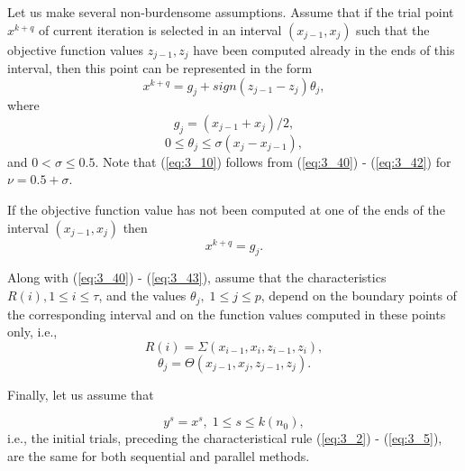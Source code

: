 	Let us make several non-burdensome assumptions. Assume that if the trial point $x^{k+q} $ of current iteration is selected in an interval $(x_{j-1} ,x_{j} )$ such that the objective function values $z_{j-1} ,z_j $ have been computed already in the ends of this interval, then this point can be represented in the form
	\begin{equation}
	\label{eq:3_40}
	x^{k+q} =g_{j} +sign(z_{j-1} -z_{j} )\theta _{j} ,
	\end{equation}
	where
	\begin{equation}
	\label{eq:3_41}
	g_{j} =(x_{j-1} +x_{j} )/2, 
	\end{equation}
	\begin{equation}
	\label{eq:3_42}
	0\le \theta _{j} \le \sigma (x_{j} -x_{j-1} ),
	\end{equation}
	and $0<\sigma \le 0.5$. Note that  (\ref{eq:3_10}) follows from  (\ref{eq:3_40}) -  (\ref{eq:3_42}) for $\nu =0.5+\sigma $.
	
	If the objective function value has not been computed at one of the ends of the interval $(x_{j-1} ,x_{j} )$ then 
	\begin{equation}
	\label{eq:3_43}
	x^{k+q} =g_{j} .
	\end{equation}
	
	Along with  (\ref{eq:3_40}) -  (\ref{eq:3_43}), assume that the characteristics $R(i), 1\le i\le \tau $, and the values $\theta _j ,\; 1\le j\le p$, depend on the boundary points of the corresponding interval and on the function values computed in these points only, i.e.,
	\begin{equation}
	\label{eq:3_44}
	R(i)=\Sigma (x_{i-1} ,x_{i} ,z_{i-1} ,z_{i} ),
	\end{equation}
	\begin{equation}
	\label{eq:3_45}
	\theta _{j} =\Theta (x_{j-1} ,x_{j} ,z_{j-1} ,z_{j} ).
	\end{equation}
	
	Finally, let us assume that 
	
	\begin{equation}
	\label{eq:3_46}
	y^s =x^s ,\; 1\le s\le k(n_{0} ),
	\end{equation}
	i.e., the initial trials, preceding the characteristical rule  (\ref{eq:3_2}) - (\ref{eq:3_5}), are the same for both sequential and parallel methods.
	
